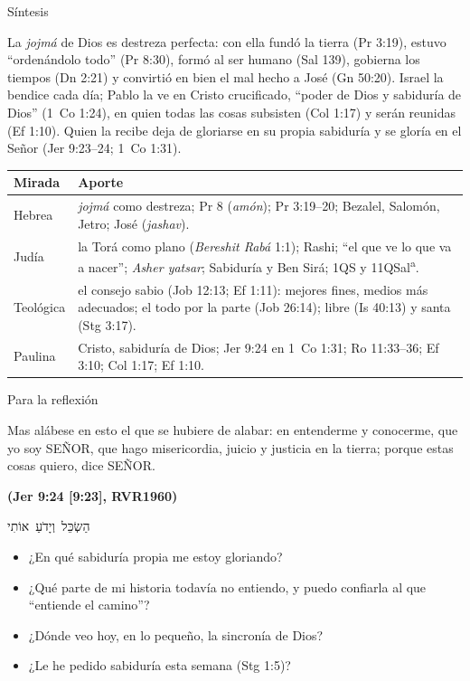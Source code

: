 \documentclass[hyperref={bookmarks=false},aspectratio=169]{beamer}
\newcommand{\heb}[1]{\mbox{\foreignlanguage{hebrew}{#1}}}
\newcommand{\SENOR}{S{\fontsize{0.78em}{1em}\selectfont EÑOR}}
\newcommand{\fuente}[1]{\par\hfill{\upshape\bfseries\footnotesize\textcolor{azul}{#1}}}
\begin{document}
\begin{frame}{Síntesis}
\begin{tcolorbox}[colback=papiro,colframe=azul,boxrule=1pt,arc=3pt]
\small La \emph{jojmá} de Dios es destreza perfecta: con ella fundó la tierra (Pr 3:19), estuvo ``ordenándolo todo'' (Pr 8:30), formó al ser humano (Sal 139), gobierna los tiempos (Dn 2:21) y convirtió en bien el mal hecho a José (Gn 50:20). Israel la bendice cada día; Pablo la ve en Cristo crucificado, ``poder de Dios y sabiduría de Dios'' (1~Co 1:24), en quien todas las cosas subsisten (Col 1:17) y serán reunidas (Ef 1:10). Quien la recibe deja de gloriarse en su propia sabiduría y se gloría en el Señor (Jer 9:23--24; 1~Co 1:31).
\end{tcolorbox}
\scriptsize\renewcommand{\arraystretch}{1.15}
\begin{tabular}{@{}>{\RaggedRight\arraybackslash}p{2.4cm}>{\RaggedRight\arraybackslash}p{9.4cm}@{}}
\toprule
\textbf{Mirada} & \textbf{Aporte} \\ \midrule
Hebrea & \emph{jojmá} como destreza; Pr 8 (\emph{amón}); Pr 3:19--20; Bezalel, Salomón, Jetro; José (\emph{jashav}). \\
Judía & la Torá como plano (\emph{Bereshit Rabá} 1:1); Rashi; ``el que ve lo que va a nacer''; \emph{Asher yatsar}; Sabiduría y Ben Sirá; 1QS y 11QSal\textsuperscript{a}. \\
Teológica & el consejo sabio (Job 12:13; Ef 1:11): mejores fines, medios más adecuados; el todo por la parte (Job 26:14); libre (Is 40:13) y santa (Stg 3:17). \\
Paulina & Cristo, sabiduría de Dios; Jer 9:24 en 1~Co 1:31; Ro 11:33--36; Ef 3:10; Col 1:17; Ef 1:10. \\
\bottomrule
\end{tabular}
\end{frame}

\begin{frame}{Para la reflexión}
\begin{cita}Mas alábese en esto el que se hubiere de alabar: en entenderme y conocerme, que yo soy \SENOR, que hago misericordia, juicio y justicia en la tierra; porque estas cosas quiero, dice \SENOR.\fuente{(Jer 9:24 [9:23], RVR1960)}\end{cita}
\begin{center}\heb{הַשְׂכֵּל וְיָדֹעַ אוֹתִי}\end{center}
\small
\begin{itemize}
\item ¿En qué sabiduría propia me estoy gloriando?
\item ¿Qué parte de mi historia todavía no entiendo, y puedo confiarla al que ``entiende el camino''?
\item ¿Dónde veo hoy, en lo pequeño, la sincronía de Dios?
\item ¿Le he pedido sabiduría esta semana (Stg 1:5)?
\end{itemize}
\end{frame}
\end{document}
